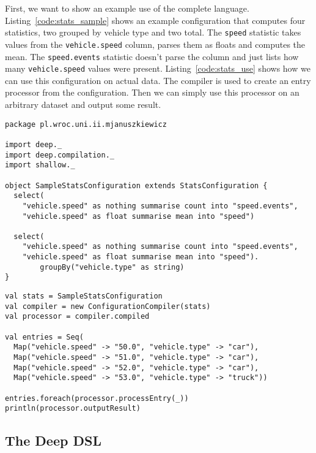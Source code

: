 First, we want to show an example use of the complete language.
Listing~\ref{code:stats_sample} shows an example configuration that computes four statistics, two grouped by vehicle type and two total.
The \texttt{speed} statistic takes values from the \texttt{vehicle.speed} column, parses them as floats and computes the mean.
The \texttt{speed.events} statistic doesn't parse the column and just lists how many \texttt{vehicle.speed} values were present.
Listing~\ref{code:stats_use} shows how we can use this configuration on actual data.
The compiler is used to create an entry processor from the configuration.
Then we can simply use this processor on an arbitrary dataset and output some result.

\begin{lstlisting}[caption=Defined statistics, label=code:stats_sample]
package pl.wroc.uni.ii.mjanuszkiewicz

import deep._
import deep.compilation._
import shallow._

object SampleStatsConfiguration extends StatsConfiguration {
  select(
    "vehicle.speed" as nothing summarise count into "speed.events",
    "vehicle.speed" as float summarise mean into "speed")

  select(
    "vehicle.speed" as nothing summarise count into "speed.events",
    "vehicle.speed" as float summarise mean into "speed").
		groupBy("vehicle.type" as string)
}
\end{lstlisting}

\begin{lstlisting}[caption=Using statistics, label=code:stats_use]
val stats = SampleStatsConfiguration
val compiler = new ConfigurationCompiler(stats)
val processor = compiler.compiled

val entries = Seq(
  Map("vehicle.speed" -> "50.0", "vehicle.type" -> "car"),
  Map("vehicle.speed" -> "51.0", "vehicle.type" -> "car"),
  Map("vehicle.speed" -> "52.0", "vehicle.type" -> "car"),
  Map("vehicle.speed" -> "53.0", "vehicle.type" -> "truck"))

entries.foreach(processor.processEntry(_))
println(processor.outputResult)
\end{lstlisting}

\subsection{The Deep DSL}

